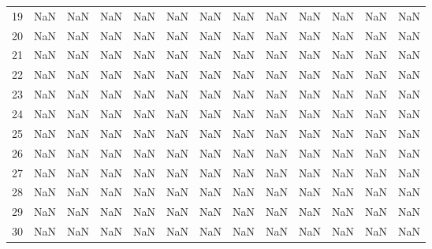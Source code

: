 \begin{table}
\begin{tabular}{lrrrrrrrrrrrr}
19 & NaN & NaN & NaN & NaN & NaN & NaN & NaN & NaN & NaN & NaN & NaN & NaN \\
20 & NaN & NaN & NaN & NaN & NaN & NaN & NaN & NaN & NaN & NaN & NaN & NaN \\
21 & NaN & NaN & NaN & NaN & NaN & NaN & NaN & NaN & NaN & NaN & NaN & NaN \\
22 & NaN & NaN & NaN & NaN & NaN & NaN & NaN & NaN & NaN & NaN & NaN & NaN \\
23 & NaN & NaN & NaN & NaN & NaN & NaN & NaN & NaN & NaN & NaN & NaN & NaN \\
24 & NaN & NaN & NaN & NaN & NaN & NaN & NaN & NaN & NaN & NaN & NaN & NaN \\
25 & NaN & NaN & NaN & NaN & NaN & NaN & NaN & NaN & NaN & NaN & NaN & NaN \\
26 & NaN & NaN & NaN & NaN & NaN & NaN & NaN & NaN & NaN & NaN & NaN & NaN \\
27 & NaN & NaN & NaN & NaN & NaN & NaN & NaN & NaN & NaN & NaN & NaN & NaN \\
28 & NaN & NaN & NaN & NaN & NaN & NaN & NaN & NaN & NaN & NaN & NaN & NaN \\
29 & NaN & NaN & NaN & NaN & NaN & NaN & NaN & NaN & NaN & NaN & NaN & NaN \\
30 & NaN & NaN & NaN & NaN & NaN & NaN & NaN & NaN & NaN & NaN & NaN & NaN \\
\bottomrule
\end{tabular}
\end{table}
